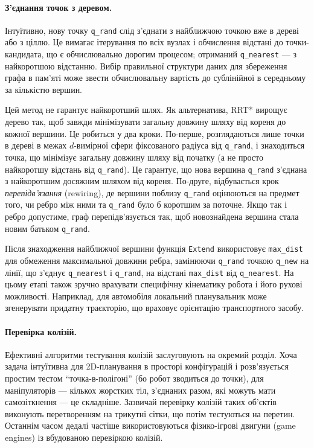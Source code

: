 \paragraph{З'єднання точок з деревом.}
Інтуїтивно, нову точку \texttt{q\_rand} слід з'єднати з найближчою точкою вже в дереві або з ціллю.
Це вимагає ітерування по всіх вузлах і обчислення відстані до точки-кандидата, що є обчислювально дорогим процесом; отриманий \texttt{q\_nearest} — з найкоротшою відстанню.
Вибір правильної структури даних для збереження графа в пам'яті може звести обчислювальну вартість до сублінійної в середньому за кількістю вершин.

Цей метод не гарантує найкоротший шлях.
Як альтернатива, RRT* вирощує дерево так, щоб завжди мінімізувати загальну довжину шляху від кореня до кожної вершини.
Це робиться у два кроки.
По-перше, розглядаються лише точки в дереві в межах $d$-вимірної сфери фіксованого радіуса від \texttt{q\_rand}, і знаходиться точка, що мінімізує загальну довжину шляху від початку (а не просто найкоротшу відстань від \texttt{q\_rand}). Це гарантує, що нова вершина \texttt{q\_rand} з'єднана з найкоротшим досяжним шляхом від кореня.
По-друге, відбувається крок \emph{перепідв'язання} (rewiring), де вершини поблизу \texttt{q\_rand} оцінюються на предмет того, чи ребро між ними та \texttt{q\_rand} було б коротшим за поточне. Якщо так і ребро допустиме, граф перепідв'язується так, щоб новознайдена вершина стала новим батьком \texttt{q\_rand}.

Після знаходження найближчої вершини функція \texttt{Extend} використовує \texttt{max\_dist} для обмеження максимальної довжини ребра, замінюючи \texttt{q\_rand} точкою \texttt{q\_new} на лінії, що з'єднує \texttt{q\_nearest} і \texttt{q\_rand}, на відстані \texttt{max\_dist} від \texttt{q\_nearest}.
На цьому етапі також зручно врахувати специфічну кінематику робота і його рухові можливості. Наприклад, для автомобіля локальний планувальник може згенерувати придатну траєкторію, що враховує орієнтацію транспортного засобу.

\paragraph{Перевірка колізій.}
Ефективні алгоритми тестування колізій заслуговують на окремий розділ. Хоча задача інтуїтивна для 2D-планування в просторі конфігурацій і розв'язується простим тестом ``точка-в-полігоні'' (бо робот зводиться до точки), для маніпуляторів — кількох жорстких тіл, з'єднаних разом, які можуть мати самозіткнення — це складніше. Зазвичай перевірку колізій таких об'єктів виконують перетворенням на трикутні сітки, що потім тестуються на перетин. Останнім часом дедалі частіше використовуються фізико-ігрові двигуни (game engines) із вбудованою перевіркою колізій.

